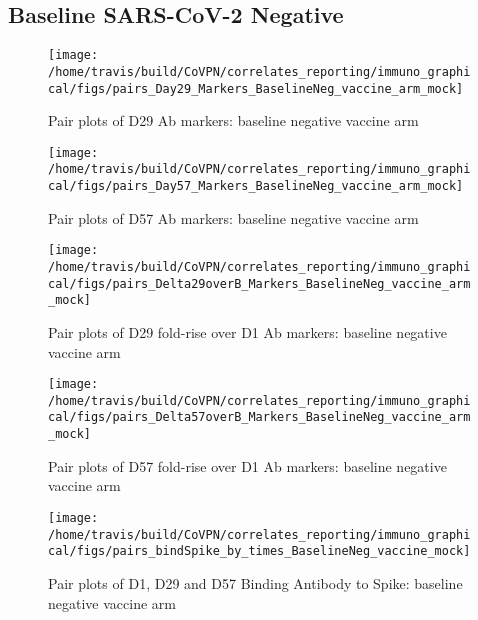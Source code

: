 \documentclass[]{book}
\theoremstyle{definition}
\theoremstyle{definition}
\theoremstyle{definition}
\newcommand{\1}{\mathbbm{1}}
\begin{document}
\hypertarget{baseline-sars-cov-2-negative}{%
\subsection{Baseline SARS-CoV-2 Negative}\label{baseline-sars-cov-2-negative}}

\begin{figure}[H]

{\centering \texttt{[image: /home/travis/build/CoVPN/correlates\_reporting/immuno\_graphical/figs/pairs\_Day29\_Markers\_BaselineNeg\_vaccine\_arm\_mock]} 

}

\caption{Pair plots of D29 Ab markers: baseline negative vaccine arm}\label{fig:unnamed-chunk-5}
\end{figure}

\clearpage
\begin{figure}[H]

{\centering \texttt{[image: /home/travis/build/CoVPN/correlates\_reporting/immuno\_graphical/figs/pairs\_Day57\_Markers\_BaselineNeg\_vaccine\_arm\_mock]} 

}

\caption{Pair plots of D57 Ab markers: baseline negative vaccine arm}\label{fig:unnamed-chunk-6}
\end{figure}

\clearpage
\begin{figure}[H]

{\centering \texttt{[image: /home/travis/build/CoVPN/correlates\_reporting/immuno\_graphical/figs/pairs\_Delta29overB\_Markers\_BaselineNeg\_vaccine\_arm\_mock]} 

}

\caption{Pair plots of D29 fold-rise over D1 Ab markers: baseline negative vaccine arm}\label{fig:unnamed-chunk-7}
\end{figure}

\clearpage
\begin{figure}[H]

{\centering \texttt{[image: /home/travis/build/CoVPN/correlates\_reporting/immuno\_graphical/figs/pairs\_Delta57overB\_Markers\_BaselineNeg\_vaccine\_arm\_mock]} 

}

\caption{Pair plots of D57 fold-rise over D1 Ab markers: baseline negative vaccine arm}\label{fig:unnamed-chunk-8}
\end{figure}

\clearpage
\begin{figure}[H]

{\centering \texttt{[image: /home/travis/build/CoVPN/correlates\_reporting/immuno\_graphical/figs/pairs\_bindSpike\_by\_times\_BaselineNeg\_vaccine\_mock]} 

}

\caption{Pair plots of D1, D29 and D57 Binding Antibody to Spike: baseline negative vaccine arm}\label{fig:unnamed-chunk-9}
\end{figure}
\end{document}
